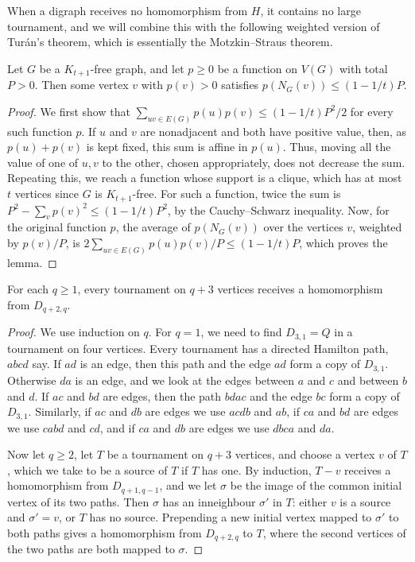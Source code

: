 When a digraph receives no homomorphism from $H$, it contains no large tournament, and we will combine this with the following weighted version of Tur\'an's theorem, which is essentially the Motzkin--Straus theorem.

\begin{lemma}\label{general:weighted-turan}
Let $G$ be a $K_{t+1}$-free graph, and let $p\ge0$ be a function on $V(G)$ with total $P>0$. Then some vertex $v$ with $p(v)>0$ satisfies $p(N_G(v))\le(1-1/t)P$.
\end{lemma}
\begin{proof}
We first show that $\sum_{uv\in E(G)}p(u)p(v)\le(1-1/t)P^2/2$ for every such function $p$.
If $u$ and $v$ are nonadjacent and both have positive value, then, as $p(u)+p(v)$ is kept fixed, this sum is affine in $p(u)$. Thus, moving all the value of one of $u,v$ to the other, chosen appropriately, does not decrease the sum. Repeating this, we reach a function whose support is a clique, which has at most $t$ vertices since $G$ is $K_{t+1}$-free. For such a function, twice the sum is $P^2-\sum_vp(v)^2\le(1-1/t)P^2$, by the Cauchy--Schwarz inequality.
Now, for the original function $p$, the average of $p(N_G(v))$ over the vertices $v$, weighted by $p(v)/P$, is $2\sum_{uv\in E(G)}p(u)p(v)/P\le(1-1/t)P$, which proves the lemma.
\end{proof}

\begin{lemma}
\label{general:tournament-paths}
For each $q\ge1$, every tournament on $q+3$ vertices receives a homomorphism from $D_{q+2,q}$.
\end{lemma}
\begin{proof}
We use induction on $q$. For $q=1$, we need to find $D_{3,1}=Q$ in a tournament on four vertices. Every tournament has a directed Hamilton path, $abcd$ say. If $ad$ is an edge, then this path and the edge $ad$ form a copy of $D_{3,1}$. Otherwise $da$ is an edge, and we look at the edges between $a$ and $c$ and between $b$ and $d$. If $ac$ and $bd$ are edges, then the path $bdac$ and the edge $bc$ form a copy of $D_{3,1}$. Similarly, if $ac$ and $db$ are edges we use $acdb$ and $ab$, if $ca$ and $bd$ are edges we use $cabd$ and $cd$, and if $ca$ and $db$ are edges we use $dbca$ and $da$.

Now let $q\ge2$, let $T$ be a tournament on $q+3$ vertices, and choose a vertex $v$ of $T$, which we take to be a source of $T$ if $T$ has one. By induction, $T-v$ receives a homomorphism from $D_{q+1,q-1}$, and we let $\sigma$ be the image of the common initial vertex of its two paths. Then $\sigma$ has an inneighbour $\sigma'$ in $T$: either $v$ is a source and $\sigma'=v$, or $T$ has no source. Prepending a new initial vertex mapped to $\sigma'$ to both paths gives a homomorphism from $D_{q+2,q}$ to $T$, where the second vertices of the two paths are both mapped to $\sigma$.
\end{proof}

